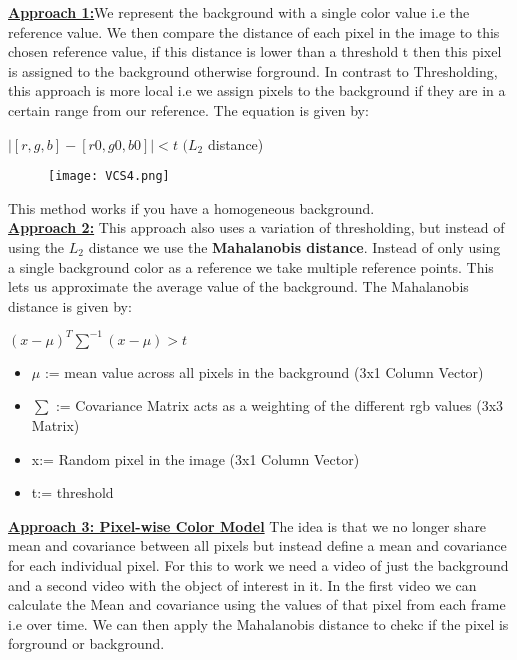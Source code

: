 \documentclass[8pt]{extreport}
\begin{document}
\underline{\textbf{Approach 1:}}We represent the background with a single color value i.e the reference value. We then compare the distance of each pixel in the image to this chosen reference value, if this distance is lower than a threshold t then this pixel is assigned to the background otherwise forground. In contrast to Thresholding, this approach is more local i.e we assign pixels to the background if they are in a certain range from our reference. The equation is given by:
\begin{center}
$|[r,g,b]-[r0, g0,b0]| < t$ $(L_2$ distance)
\end{center}
\begin{figure}[H]
\centering
\texttt{[image: VCS4.png]}
\end{figure}
This method works if you have a homogeneous background.\\
\underline{\textbf{Approach 2:}} This approach also uses a variation of thresholding, but instead of using the $L_2$ distance we use the \textbf{Mahalanobis distance}. Instead of only using a single background color as a reference we take multiple reference points. This lets us approximate the average value of the background. The Mahalanobis distance is given by:
\begin{center}
$ (x -\mu)^T\sum^{-1}(x-\mu) > t$
\end{center}
\begin{itemize}
\item $\mu$ := mean value across all pixels in the background (3x1 Column Vector)
\item $\sum$ := Covariance Matrix acts as a weighting of the different rgb values (3x3 Matrix)
\item x:= Random pixel in the image (3x1 Column Vector)
\item t:= threshold
\end{itemize}
\underline{\textbf{Approach 3: Pixel-wise Color Model}} The idea is that we no longer share mean and covariance between all pixels but instead define a mean and covariance for each individual pixel. For this to work we need a video of just the background and a second video with the object of interest in it. In the first video we can calculate the Mean and covariance using the values of that pixel from each frame i.e over time. We can then apply the Mahalanobis distance to chekc if the pixel is forground or background.
\end{document}
